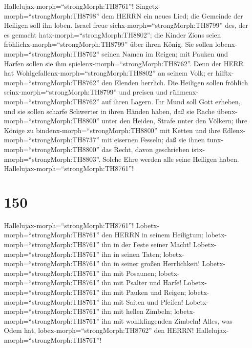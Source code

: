  Hallelujax-morph=``strongMorph:TH8761''!
Singetx-morph=``strongMorph:TH8798'' dem HERRN ein neues Lied; die
Gemeinde der Heiligen soll ihn loben.  Israel freue
sichx-morph=``strongMorph:TH8799'' des, der es gemacht
hatx-morph=``strongMorph:TH8802''; die Kinder Zions seien
fröhlichx-morph=``strongMorph:TH8799'' über ihren König. 
Sie sollen lobenx-morph=``strongMorph:TH8762'' seinen Namen im Reigen;
mit Pauken und Harfen sollen sie ihm
spielenx-morph=``strongMorph:TH8762''.  Denn der HERR hat
Wohlgefallenx-morph=``strongMorph:TH8802'' an seinem Volk; er
hilftx-morph=``strongMorph:TH8762'' den Elenden herrlich. 
Die Heiligen sollen fröhlich seinx-morph=``strongMorph:TH8799'' und
preisen und rühmenx-morph=``strongMorph:TH8762'' auf ihren Lagern.
 Ihr Mund soll Gott erheben, und sie sollen scharfe
Schwerter in ihren Händen haben,  daß sie Rache
übenx-morph=``strongMorph:TH8800'' unter den Heiden, Strafe unter den
Völkern;  ihre Könige zu
bindenx-morph=``strongMorph:TH8800'' mit Ketten und ihre
Edlenx-morph=``strongMorph:TH8737'' mit eisernen Fesseln; 
daß sie ihnen tunx-morph=``strongMorph:TH8800'' das Recht, davon
geschrieben istx-morph=``strongMorph:TH8803''. Solche Ehre werden alle
seine Heiligen haben. Hallelujax-morph=``strongMorph:TH8761''!

\hypertarget{section-149}{%
\section{150}\label{section-149}}

 Hallelujax-morph=``strongMorph:TH8761''!
Lobetx-morph=``strongMorph:TH8761'' den HERRN in seinem Heiligtum;
lobetx-morph=``strongMorph:TH8761'' ihn in der Feste seiner Macht!
 Lobetx-morph=``strongMorph:TH8761'' ihn in seinen Taten;
lobetx-morph=``strongMorph:TH8761'' ihn in seiner großen Herrlichkeit!
 Lobetx-morph=``strongMorph:TH8761'' ihn mit Posaunen;
lobetx-morph=``strongMorph:TH8761'' ihn mit Psalter und Harfe!
 Lobetx-morph=``strongMorph:TH8761'' ihn mit Pauken und
Reigen; lobetx-morph=``strongMorph:TH8761'' ihn mit Saiten und Pfeifen!
 Lobetx-morph=``strongMorph:TH8761'' ihn mit hellen Zimbeln;
lobetx-morph=``strongMorph:TH8761'' ihn mit wohlklingenden Zimbeln!
 Alles, was Odem hat, lobex-morph=``strongMorph:TH8762'' den
HERRN! Hallelujax-morph=``strongMorph:TH8761''!
